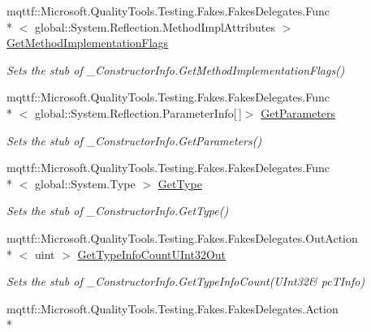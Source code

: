 \begin{DoxyCompactItemize}
mqttf\-::\-Microsoft.\-Quality\-Tools.\-Testing.\-Fakes.\-Fakes\-Delegates.\-Func\\*
$<$ global\-::\-System.\-Reflection.\-Method\-Impl\-Attributes $>$ \hyperlink{class_system_1_1_runtime_1_1_interop_services_1_1_fakes_1_1_stub___constructor_info_a1a44c28ebf1d8caf62756157e8ab5b1c}{Get\-Method\-Implementation\-Flags}
\begin{DoxyCompactList}\small\item\em Sets the stub of \-\_\-\-Constructor\-Info.\-Get\-Method\-Implementation\-Flags()\end{DoxyCompactList}\item 
mqttf\-::\-Microsoft.\-Quality\-Tools.\-Testing.\-Fakes.\-Fakes\-Delegates.\-Func\\*
$<$ global\-::\-System.\-Reflection.\-Parameter\-Info\mbox{[}$\,$\mbox{]}$>$ \hyperlink{class_system_1_1_runtime_1_1_interop_services_1_1_fakes_1_1_stub___constructor_info_af5a1a5a539ebb2e36a523ff23ed62243}{Get\-Parameters}
\begin{DoxyCompactList}\small\item\em Sets the stub of \-\_\-\-Constructor\-Info.\-Get\-Parameters()\end{DoxyCompactList}\item 
mqttf\-::\-Microsoft.\-Quality\-Tools.\-Testing.\-Fakes.\-Fakes\-Delegates.\-Func\\*
$<$ global\-::\-System.\-Type $>$ \hyperlink{class_system_1_1_runtime_1_1_interop_services_1_1_fakes_1_1_stub___constructor_info_a6c32ec97e559efae2794324247402f4e}{Get\-Type}
\begin{DoxyCompactList}\small\item\em Sets the stub of \-\_\-\-Constructor\-Info.\-Get\-Type()\end{DoxyCompactList}\item 
mqttf\-::\-Microsoft.\-Quality\-Tools.\-Testing.\-Fakes.\-Fakes\-Delegates.\-Out\-Action\\*
$<$ uint $>$ \hyperlink{class_system_1_1_runtime_1_1_interop_services_1_1_fakes_1_1_stub___constructor_info_a26304d7eefe97235c0998e14fcbbc7e7}{Get\-Type\-Info\-Count\-U\-Int32\-Out}
\begin{DoxyCompactList}\small\item\em Sets the stub of \-\_\-\-Constructor\-Info.\-Get\-Type\-Info\-Count(U\-Int32\& pc\-T\-Info)\end{DoxyCompactList}\item 
mqttf\-::\-Microsoft.\-Quality\-Tools.\-Testing.\-Fakes.\-Fakes\-Delegates.\-Action\\*

\end{DoxyCompactItemize}
